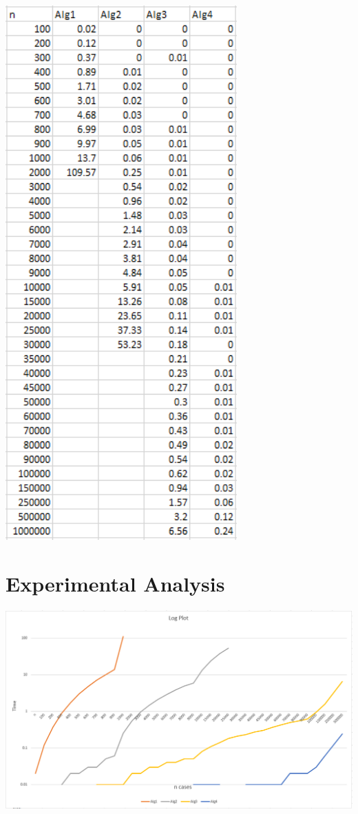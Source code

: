 \documentclass[11pt,letterpaper]{article}
\begin{document}
\centerline{\includegraphics[width=3.5in]{TestTimes.png}}
\pagebreak

\section{Experimental Analysis}
\centerline{\includegraphics[width=7in]{LogPlot.png}}
\end{document}
